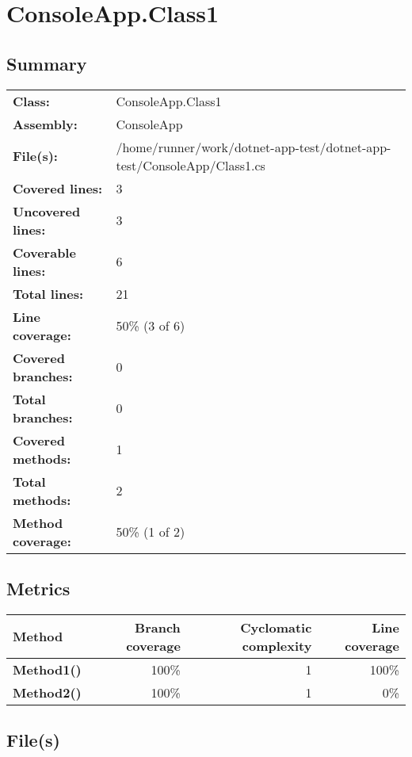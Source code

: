 \documentclass[a4paper,landscape,10pt]{article}
\begin{document}
\section{ConsoleApp.Class1}
\subsection{Summary}
\begin{longtable}[l]{ll}
\textbf{Class:} & ConsoleApp.Class1\\
\textbf{Assembly:} & ConsoleApp\\
\textbf{File(s):} & \begin{minipage}[t]{12cm}{/home/runner/work/dotnet-app-test/dotnet-app-test/ConsoleApp/Class1.cs}\end{minipage} \\
\textbf{Covered lines:} & 3\\
\textbf{Uncovered lines:} & 3\\
\textbf{Coverable lines:} & 6\\
\textbf{Total lines:} & 21\\
\textbf{Line coverage:} & 50\% (3 of 6)\\
\textbf{Covered branches:} & 0\\
\textbf{Total branches:} & 0\\
\textbf{Covered methods:} & 1\\
\textbf{Total methods:} & 2\\
\textbf{Method coverage:} & 50\% (1 of 2)\\
\end{longtable}
\subsection{Metrics}
\begin{longtable}[l]{|l|r|r|r|}
\hline
\textbf{Method} & \textbf{Branch coverage} & \textbf{Cyclomatic complexity} & \textbf{Line coverage}\\
\hline
\textbf{Method1()} & 100\% & 1 & 100\%\\
\hline
\textbf{Method2()} & 100\% & 1 & 0\%\\
\hline
\end{longtable}
\subsection{File(s)}
\end{document}
